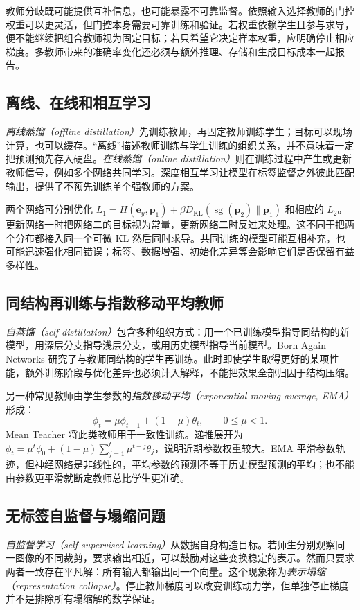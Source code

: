 \documentclass[UTF8,12pt,a4paper,fontset=fandol]{ctexart}
\begin{document}
教师分歧既可能提供互补信息，也可能暴露不可靠监督。依照输入选择教师的门控权重可以更灵活，但门控本身需要可靠训练和验证。若权重依赖学生且参与求导，便不能继续把组合教师视为固定目标；若只希望它决定样本权重，应明确停止相应梯度。多教师带来的准确率变化还必须与额外推理、存储和生成目标成本一起报告。

\subsection{离线、在线和相互学习}
\emph{离线蒸馏（offline distillation）}先训练教师，再固定教师训练学生；目标可以现场计算，也可以缓存。“离线”描述教师训练与学生训练的组织关系，并不意味着一定把预测预先存入硬盘。\emph{在线蒸馏（online distillation）}则在训练过程中产生或更新教师信号，例如多个网络共同学习。深度相互学习\cite{zhang2018}让模型在标签监督之外彼此匹配输出，提供了不预先训练单个强教师的方案。

两个网络可分别优化 $L_1=H(\mathbf e_y,\mathbf p_1)+\beta D_{\mathrm{KL}}(\operatorname{sg}(\mathbf p_2)\|\mathbf p_1)$ 和相应的 $L_2$。更新网络一时把网络二的目标视为常量，更新网络二时反过来处理。这不同于把两个分布都接入同一个可微 KL 然后同时求导。共同训练的模型可能互相补充，也可能迅速强化相同错误；标签、数据增强、初始化差异等会影响它们是否保留有益多样性。

\subsection{同结构再训练与指数移动平均教师}
\emph{自蒸馏（self-distillation）}包含多种组织方式：用一个已训练模型指导同结构的新模型，用深层分支指导浅层分支，或用历史模型指导当前模型。Born Again Networks 研究了与教师同结构的学生再训练\cite{furlanello2018}。此时即使学生取得更好的某项性能，额外训练阶段与优化差异也必须计入解释，不能把效果全部归因于结构压缩。

另一种常见教师由学生参数的\emph{指数移动平均（exponential moving average, EMA）}形成：
\begin{equation}
 \phi_t=\mu\phi_{t-1}+(1-\mu)\theta_t,\qquad 0\leq\mu<1.
 \label{eq:kd-ema}
\end{equation}
Mean Teacher 将此类教师用于一致性训练\cite{tarvainen2017}。递推展开为 $\phi_t=\mu^t\phi_0+(1-\mu)\sum_{j=1}^t\mu^{t-j}\theta_j$，说明近期参数权重较大。EMA 平滑参数轨迹，但神经网络是非线性的，平均参数的预测不等于历史模型预测的平均；也不能由参数更平滑就断定教师总比学生更准确。

\subsection{无标签自监督与塌缩问题}
\emph{自监督学习（self-supervised learning）}从数据自身构造目标。若师生分别观察同一图像的不同裁剪，要求输出相近，可以鼓励对这些变换稳定的表示。然而只要求两者一致存在平凡解：所有输入都输出同一个向量。这个现象称为\emph{表示塌缩（representation collapse）}。停止教师梯度可以改变训练动力学，但单独停止梯度并不是排除所有塌缩解的数学保证。
\end{document}
